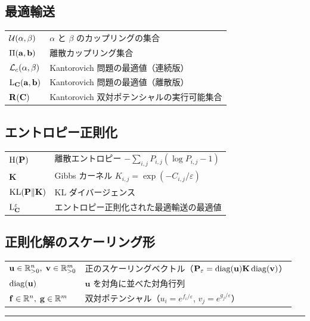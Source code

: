 \documentclass[uplatex, dvipdfmx]{jsreport}
\begin{document}
\subsection*{最適輸送}
\begin{tabular}{ll}
  $\mathcal{U}(\alpha, \beta)$ & $\alpha$ と $\beta$ のカップリングの集合 \\
  $\Pi(\mathbf{a}, \mathbf{b})$ & 離散カップリング集合 \\
  $\mathcal{L}_c(\alpha, \beta)$ & Kantorovich 問題の最適値（連続版） \\
  $\mathrm{L}_{\mathbf{C}}(\mathbf{a}, \mathbf{b})$ & Kantorovich 問題の最適値（離散版） \\
  $\mathbf{R}(\mathbf{C})$ & Kantorovich 双対ポテンシャルの実行可能集合 \\
\end{tabular}

\subsection*{エントロピー正則化}
\begin{tabular}{ll}
  $\mathrm{H}(\mathbf{P})$ & 離散エントロピー $-\sum_{i,j} P_{i,j}(\log P_{i,j} - 1)$ \\
  $\mathbf{K}$ & Gibbs カーネル $K_{i,j} = \exp(-C_{i,j}/\varepsilon)$ \\
  $\mathrm{KL}(\mathbf{P} \| \mathbf{K})$ & KL ダイバージェンス \\
  $\mathrm{L}_{\mathbf{C}}^\varepsilon$ & エントロピー正則化された最適輸送の最適値 \\
\end{tabular}

\subsection*{正則化解のスケーリング形}
\begin{tabular}{ll}
  $\mathbf{u} \in \mathbb{R}_{>0}^n,\; \mathbf{v} \in \mathbb{R}_{>0}^m$
    & 正のスケーリングベクトル（$\mathbf{P}_\varepsilon = \operatorname{diag}(\mathbf{u})\mathbf{K}\operatorname{diag}(\mathbf{v})$） \\
  $\operatorname{diag}(\mathbf{u})$ & $\mathbf{u}$ を対角に並べた対角行列 \\
  $\mathbf{f} \in \mathbb{R}^n,\; \mathbf{g} \in \mathbb{R}^m$
    & 双対ポテンシャル（$u_i = e^{f_i/\varepsilon}$, $v_j = e^{g_j/\varepsilon}$） \\
\end{tabular}

\vspace{1em}
\hrule






\appendix




\end{document}
